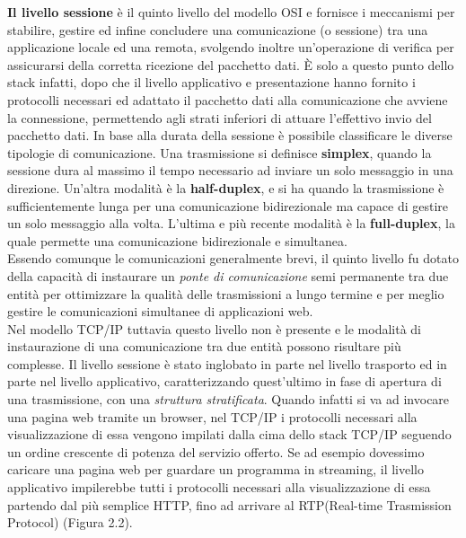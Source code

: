 \documentclass[a4paper, 11pt, oneside]{book}
\theoremstyle{plain}
\newlength\Textwd
\newcommand\Textbox[2]{%
  \parbox[c][#1][c]{\Textwd}{\centering#2}}
\begin{document}
\textbf{Il livello sessione} è il quinto livello del modello OSI e fornisce i meccanismi per stabilire, gestire ed infine concludere una comunicazione (o sessione) tra una applicazione locale ed una remota, svolgendo inoltre un'operazione di verifica per assicurarsi della corretta ricezione del pacchetto dati. È solo a questo punto dello stack infatti, dopo che il livello applicativo e presentazione hanno fornito i protocolli necessari ed adattato il pacchetto dati alla comunicazione che avviene la connessione, permettendo agli strati inferiori di attuare l'effettivo invio del pacchetto dati. In base alla durata della sessione è possibile classificare le diverse tipologie di comunicazione. Una trasmissione si definisce \textbf{simplex}, quando la sessione dura al massimo il tempo necessario ad inviare un solo messaggio in una direzione. Un'altra modalità è la \textbf{half-duplex}, e si ha quando la trasmissione è sufficientemente lunga per una comunicazione bidirezionale ma capace di gestire un solo messaggio alla volta. L'ultima e più recente modalità è la \textbf{full-duplex}, la quale permette una comunicazione bidirezionale e simultanea. \\ Essendo comunque le comunicazioni generalmente brevi, il quinto livello fu dotato della capacità di instaurare un \textit{ponte di comunicazione} semi permanente tra due entità per ottimizzare la qualità delle trasmissioni a lungo termine e per meglio gestire le comunicazioni simultanee di applicazioni web.\\ Nel modello TCP/IP tuttavia questo livello non è presente e le modalità di instaurazione di una comunicazione tra due entità possono risultare più complesse. Il livello sessione è stato inglobato in parte nel livello trasporto ed in parte nel livello applicativo, caratterizzando quest'ultimo in fase di apertura di una trasmissione, con una\textit{ struttura stratificata}. Quando infatti si va ad invocare una pagina web tramite un browser, nel TCP/IP i protocolli necessari alla visualizzazione di essa vengono impilati dalla cima dello stack TCP/IP seguendo un ordine crescente di potenza del servizio offerto. Se ad esempio dovessimo caricare una pagina web per guardare un programma in streaming, il livello applicativo impilerebbe tutti i protocolli necessari alla visualizzazione di essa partendo dal più semplice HTTP, fino ad arrivare al RTP(Real-time Trasmission Protocol) (Figura 2.2).
\begin{center}
\end{center}
\end{document}
